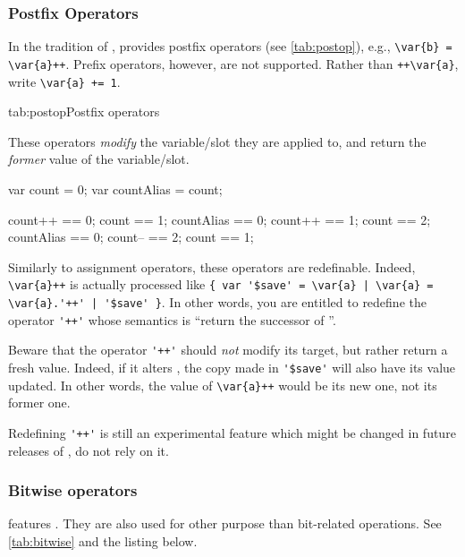 \subsubsection{Postfix Operators}
\label{sec:lang:postop}

In the tradition of \C, \us provides postfix operators (see
\autoref{tab:postop}), e.g., \lstinline|\var{b} = \var{a}++|.  Prefix
operators, however, are not supported.  Rather than \lstinline|++\var{a}|,
write \lstinline|\var{a} += 1|.

\begin{operatorTable}{tab:postop}{Postfix operators}
  \operatorinc\\
  \operatordec
\end{operatorTable}

These operators \emph{modify} the variable/slot they are applied to, and
return the \emph{former} value of the variable/slot.

\begin{urbiassert}
var count = 0;
var countAlias = count;

count++    == 0;
count      == 1;
countAlias == 0;
count++    == 1;
count      == 2;
countAlias == 0;
count--    == 2;
count      == 1;
\end{urbiassert}

Similarly to assignment operators, these operators are redefinable.
Indeed, \lstinline|\var{a}++| is actually processed like
\lstinline-{ var '$save' = \var{a} | \var{a} = \var{a}.'++' | '$save' }-.
In other words, you are entitled to redefine the operator \lstinline|'++'|
whose semantics is ``return the successor of \this''.

Beware that the operator \lstinline|'++'| should \emph{not} modify its
target, but rather return a fresh value.  Indeed, if it alters \this, the
copy made in \lstinline|'$save'| will also have its value updated.
In %
other words, the value of \lstinline|\var{a}++| would be its new one, not
its former one.

Redefining \lstinline|'++'| is still an experimental feature which might be
changed in future releases of \usdk, do not rely on it.

\subsubsection{Bitwise operators}
\label{sec:lang:bitwise}

\us features .  They are also used for other
purpose than bit-related operations. See \autoref{tab:bitwise} and the
listing below.

